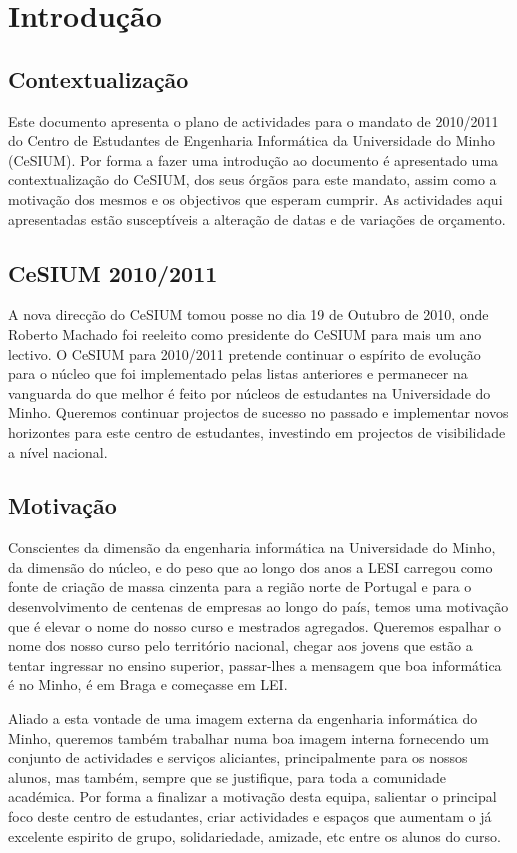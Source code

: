 \section{Introdução}

\subsection{Contextualização}
\indent Este documento apresenta o plano de actividades para o mandato de 2010/2011 do Centro de Estudantes de Engenharia Informática da Universidade do Minho (CeSIUM). Por forma a fazer uma introdução ao documento é apresentado uma contextualização do CeSIUM, dos seus órgãos para este mandato, assim como a motivação dos mesmos e os objectivos que esperam cumprir. As actividades aqui apresentadas estão susceptíveis a alteração de datas e de variações de orçamento.

\subsection{CeSIUM 2010/2011}
\indent A nova direcção do CeSIUM tomou posse no dia 19 de Outubro de 2010, onde Roberto Machado foi reeleito como presidente do CeSIUM para mais um ano lectivo. O CeSIUM para 2010/2011 pretende continuar o espírito de evolução para o núcleo que foi implementado pelas listas anteriores e permanecer na vanguarda do que melhor é feito por núcleos de estudantes na Universidade do Minho. Queremos continuar projectos de sucesso no passado e implementar novos horizontes para este centro de estudantes, investindo em projectos de visibilidade a nível nacional.

\subsection{Motivação}
\indent Conscientes da dimensão da engenharia informática na Universidade do Minho, da dimensão do núcleo, e do peso que ao longo dos anos a LESI carregou como fonte de criação de massa cinzenta para a região norte de Portugal e para o desenvolvimento de centenas de empresas ao longo do país, temos uma motivação que é elevar o nome do nosso curso e mestrados agregados. Queremos espalhar o nome dos nosso curso pelo território nacional, chegar aos jovens que estão a tentar ingressar no ensino superior, passar-lhes a mensagem que boa informática é no Minho, é em Braga e começasse em LEI. 

\indent Aliado a esta vontade de uma imagem externa da engenharia informática do Minho, queremos também trabalhar numa boa imagem interna fornecendo um conjunto de actividades e serviços aliciantes, principalmente para os nossos alunos, mas também, sempre que se justifique, para toda a comunidade académica. Por forma a finalizar a motivação desta equipa, salientar o principal foco deste centro de estudantes, criar actividades e espaços que aumentam o já excelente espirito de grupo, solidariedade, amizade, etc entre os alunos do curso.

